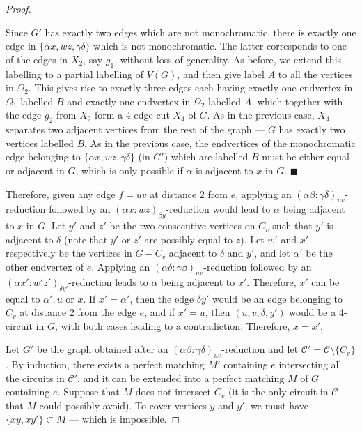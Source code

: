 \documentclass[]{theclass}
\begin{document}
\begin{proof}
\begin{enumerate}[label=(B\arabic*), start=0]
Since $G'$ has exactly two edges which are not monochromatic, there is exactly one edge in $\{\alpha x, wz,\gamma\delta\}$ which is not monochromatic. The latter corresponds to one of the edges in $X_2$, say $g_1$, without loss of generality. As before, we extend this labelling to a partial labelling of $V(G)$, and then give label $A$ to all the vertices in $\Omega_{2}$. This gives rise to exactly three edges each having exactly one endvertex in $\Omega_{1}$ labelled $B$ and exactly one endvertex in $\Omega_{2}$ labelled $A$, which together with the edge $g_2$ from $X_2$ form a 4-edge-cut $X_4$ of $G$. As in the previous case, $X_4$ separates two adjacent vertices from the rest of the graph --- $G$ has exactly two vertices labelled $B$. As in the previous case, the endvertices of the monochromatic edge belonging to $\{\alpha x, wz,\gamma\delta\}$ (in $G'$) which are labelled $B$ must be either equal or adjacent in $G$, which is only possible if $\alpha$ is adjacent to $x$ in $G$.
\hfill {\tiny$\blacksquare$}
\end{enumerate}

Therefore, given any edge $f=uv$ at distance 2 from $e$, applying an $(\alpha\beta:\gamma\delta)_{uv}$-reduction followed by an $(\alpha x:wz)_{\beta y}$-reduction would lead to $\alpha$ being adjacent to $x$ in $G$. Let $y'$ and $z'$ be the two consecutive vertices on $C_v$ such that $y'$ is adjacent to $\delta$ (note that $y'$ or $z'$ are possibly equal to $z$). Let $w'$ and $x'$ respectively be the vertices in  $G-C_v$ adjacent to $\delta$ and $y'$, and let $\alpha'$ be the other endvertex of $e$. Applying an $(\alpha\delta:\gamma\beta)_{uv}$-reduction followed by an $(\alpha x':w'z')_{\delta y'}$-reduction leads to $\alpha$ being adjacent to $x'$. Therefore, $x'$ can be equal to $\alpha', u$ or $x$. If $x'=\alpha'$, then the edge $\delta y'$ would be an edge belonging to $C_v$  at distance 2 from the edge $e$, and if $x'=u$, then $(u,v,\delta,y')$ would be a 4-circuit in $G$, with both cases leading to a contradiction. Therefore, $x=x'$.

Let $G'$ be the graph obtained after an $(\alpha\beta:\gamma\delta)_{uv}$-reduction and let $\mathcal{C}'=\mathcal{C}\setminus \{C_v\}$. By induction, there exists a perfect matching $M'$ containing $e$ intersecting all the circuits in $\mathcal{C}'$, and it can be extended into a perfect matching $M$ of $G$ containing $e$. Suppose that $M$ does not intersect $C_v$ (it is the only circuit in $\mathcal{C}$ that $M$ could possibly avoid). To cover vertices $y$ and $y'$, we must have $\{xy,xy'\}\subset M$ --- which is impossible. 
\end{proof}
\end{document}
